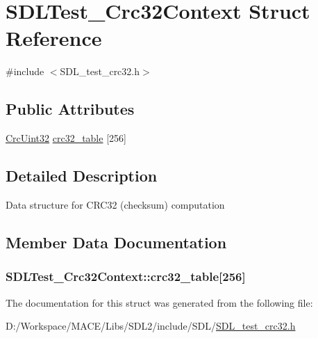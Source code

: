 \hypertarget{struct_s_d_l_test___crc32_context}{}\section{S\+D\+L\+Test\+\_\+\+Crc32\+Context Struct Reference}
\label{struct_s_d_l_test___crc32_context}


{\ttfamily \#include $<$S\+D\+L\+\_\+test\+\_\+crc32.\+h$>$}

\subsection*{Public Attributes}
\begin{DoxyCompactItemize}
\item 
\hyperlink{_s_d_l__test__crc32_8h_ac0e8fe38fa91e9aa4b32957420795387}{Crc\+Uint32} \hyperlink{struct_s_d_l_test___crc32_context_ae95d0d0b48bafc4e2f6f032f754ffa4c}{crc32\+\_\+table} \mbox{[}256\mbox{]}
\end{DoxyCompactItemize}


\subsection{Detailed Description}
Data structure for C\+R\+C32 (checksum) computation 

\subsection{Member Data Documentation}
\subsubsection[{\texorpdfstring{crc32\+\_\+table}{crc32_table}}]{ S\+D\+L\+Test\+\_\+\+Crc32\+Context\+::crc32\+\_\+table\mbox{[}256\mbox{]}}\hypertarget{struct_s_d_l_test___crc32_context_ae95d0d0b48bafc4e2f6f032f754ffa4c}{}\label{struct_s_d_l_test___crc32_context_ae95d0d0b48bafc4e2f6f032f754ffa4c}


The documentation for this struct was generated from the following file\+:\begin{DoxyCompactItemize}
\item 
D\+:/\+Workspace/\+M\+A\+C\+E/\+Libs/\+S\+D\+L2/include/\+S\+D\+L/\hyperlink{_s_d_l__test__crc32_8h}{S\+D\+L\+\_\+test\+\_\+crc32.\+h}\end{DoxyCompactItemize}
